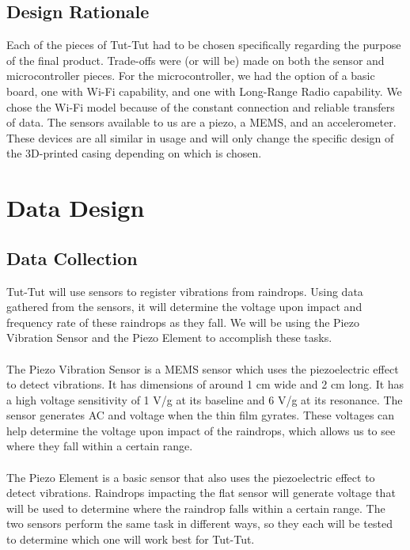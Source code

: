 \documentclass[letterpaper,10pt,draftclsnofoot,onecolumn]{article}
\begin{document}
\subsection{Design Rationale}
Each of the pieces of Tut-Tut had to be chosen specifically regarding the purpose of the final product. Trade-offs were (or will be) made on both the sensor and microcontroller pieces. For the microcontroller, we had the option of a basic board, one with Wi-Fi capability, and one with Long-Range Radio capability. We chose the Wi-Fi model because of the constant connection and reliable transfers of data. The sensors available to us are a piezo, a MEMS, and an accelerometer. These devices are all similar in usage and will only change the specific design of the 3D-printed casing depending on which is chosen.


\section{Data Design}

\subsection{Data Collection}
Tut-Tut will use sensors to register vibrations from raindrops. Using data gathered from the sensors, it will determine the voltage upon impact and frequency rate of these raindrops as they fall. We will be using the Piezo Vibration Sensor and the Piezo Element to accomplish these tasks. 
\\
\\
The Piezo Vibration Sensor is a MEMS sensor which uses the piezoelectric effect to detect vibrations. It has dimensions of around 1 cm wide and 2 cm long. It has a high voltage sensitivity of 1 V/g at its baseline and 6 V/g at its resonance. The sensor generates AC and voltage when the thin film gyrates. These voltages can help determine the voltage upon impact of the raindrops, which allows us to see where they fall within a certain range.
\\
\\
The Piezo Element is a basic sensor that also uses the piezoelectric effect to detect vibrations. Raindrops impacting the flat sensor will generate voltage that will be used to determine where the raindrop falls within a certain range. The two sensors perform the same task in different ways, so they each will be tested to determine which one will work best for Tut-Tut.
\end{document}
